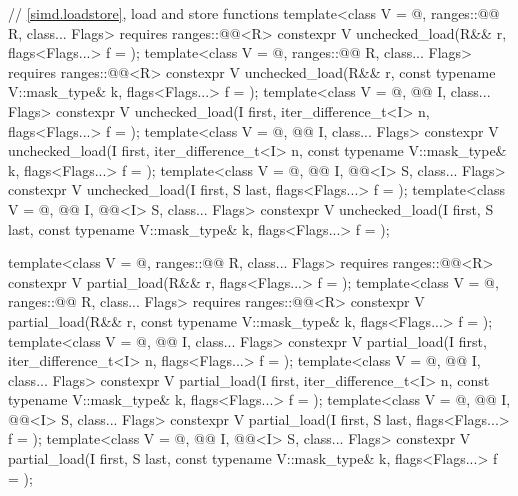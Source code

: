 \begin{codeblock}
{  // \ref{simd.loadstore}, load and store functions
  template<class V = @\seebelow@, ranges::@@ R, class... Flags>
    requires ranges::@@<R>
    constexpr V unchecked_load(R&& r, flags<Flags...> f = {});
  template<class V = @\seebelow@, ranges::@@ R, class... Flags>
    requires ranges::@@<R>
    constexpr V unchecked_load(R&& r, const typename V::mask_type& k,
                               flags<Flags...> f = {});
  template<class V = @\seebelow@, @@ I, class... Flags>
    constexpr V unchecked_load(I first, iter_difference_t<I> n,
                               flags<Flags...> f = {});
  template<class V = @\seebelow@, @@ I, class... Flags>
    constexpr V unchecked_load(I first, iter_difference_t<I> n,
                               const typename V::mask_type& k, flags<Flags...> f = {});
  template<class V = @\seebelow@, @@ I, @@<I> S, class... Flags>
    constexpr V unchecked_load(I first, S last, flags<Flags...> f = {});
  template<class V = @\seebelow@, @@ I, @@<I> S, class... Flags>
    constexpr V unchecked_load(I first, S last, const typename V::mask_type& k,
                               flags<Flags...> f = {});

  template<class V = @\seebelow@, ranges::@@ R, class... Flags>
    requires ranges::@@<R>
    constexpr V partial_load(R&& r, flags<Flags...> f = {});
  template<class V = @\seebelow@, ranges::@@ R, class... Flags>
    requires ranges::@@<R>
    constexpr V partial_load(R&& r, const typename V::mask_type& k,
                             flags<Flags...> f = {});
  template<class V = @\seebelow@, @@ I, class... Flags>
    constexpr V partial_load(I first, iter_difference_t<I> n, flags<Flags...> f = {});
  template<class V = @\seebelow@, @@ I, class... Flags>
    constexpr V partial_load(I first, iter_difference_t<I> n,
                             const typename V::mask_type& k, flags<Flags...> f = {});
  template<class V = @\seebelow@, @@ I, @@<I> S, class... Flags>
    constexpr V partial_load(I first, S last, flags<Flags...> f = {});
  template<class V = @\seebelow@, @@ I, @@<I> S, class... Flags>
    constexpr V partial_load(I first, S last, const typename V::mask_type& k,
                             flags<Flags...> f = {});

}
\end{codeblock}
